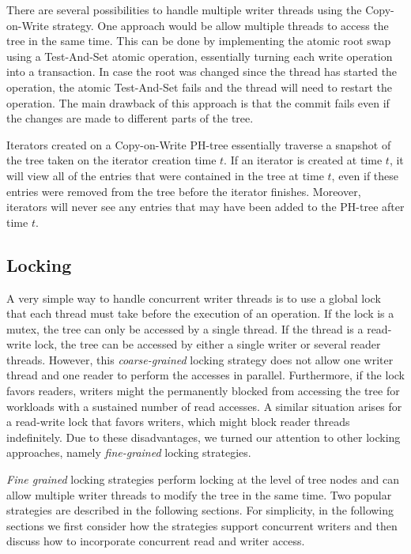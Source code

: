 \documentclass[11pt,a4paper]{globis-book}
\begin{document}
There are several possibilities to handle multiple writer threads using the Copy-on-Write strategy. One approach would be allow multiple threads to access the tree in the same time. This can be done by implementing the atomic root swap using a Test-And-Set atomic operation, essentially turning each write operation into a transaction. In case the root was changed since the thread has started the operation, the atomic Test-And-Set fails and the thread will need to restart the operation. The main drawback of this approach is that the commit fails even if the changes are made to different parts of the tree.

Iterators created on a Copy-on-Write PH-tree essentially traverse a snapshot of the tree taken on the iterator creation time $t$. If an iterator is created at time $t$, it will view all of the entries that were contained in the tree at time $t$, even if these entries were removed from the tree before the iterator finishes. Moreover, iterators will never see any entries that may have been added to the PH-tree after time $t$.

\subsection{Locking}

A very simple way to handle concurrent writer threads is to use a global lock that each thread must take before the execution of an operation. If the lock is a mutex, the tree can only be accessed by a single thread. If the thread is a read-write lock, the tree can be accessed by either a single writer or several reader threads. However, this \textit{coarse-grained} locking strategy does not allow one writer thread and one reader to perform the accesses in parallel. Furthermore, if the lock favors readers, writers might the permanently blocked from accessing the tree for workloads with a sustained number of read accesses. A similar situation arises for a read-write lock that favors writers, which might block reader threads indefinitely. Due to these disadvantages, we turned our attention to other locking approaches, namely \textit{fine-grained} locking strategies.  

\textit{Fine grained} locking strategies perform locking at the level of tree nodes and can allow multiple writer threads to modify the tree in the same time. Two popular strategies are described in the following sections. For simplicity, in the following sections we first consider how the strategies support concurrent writers and then discuss how to incorporate concurrent read and writer access.  
\end{document}
